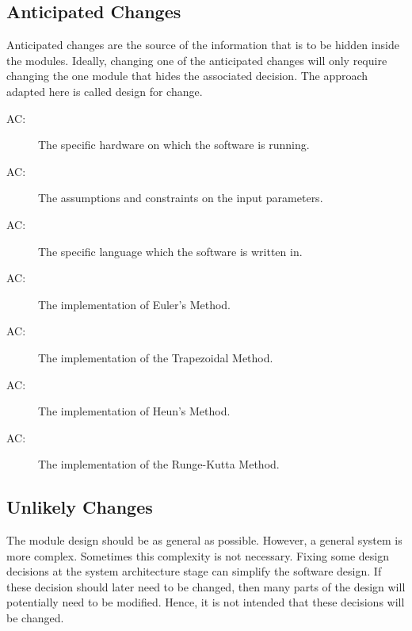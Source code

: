 \documentclass[12pt, titlepage]{article}
\newcounter{acnum}
\newcommand{\actheacnum}{AC\theacnum}
\begin{document}
\subsection{Anticipated Changes} \label{SecAchange}

Anticipated changes are the source of the information that is to be hidden
inside the modules. Ideally, changing one of the anticipated changes will only
require changing the one module that hides the associated decision. The approach
adapted here is called design for change.

\begin{description}
\item[ \actheacnum \label{acHardware}:] The specific
  hardware on which the software is running.
\item[ \actheacnum \label{acConstraints}:] The assumptions and constraints
on the input parameters.
\item[ \actheacnum \label{acLanguage}:] The specific language
which the software is written in. 
\item[ \actheacnum \label{acEulerMethod}:] The implementation
of Euler's Method.
\item[ \actheacnum \label{acTrapMethod}:] The implementation
of the Trapezoidal Method.
\item[ \actheacnum \label{acHeunMethod}:] The implementation
of Heun's Method.
\item[ \actheacnum \label{acRKMethod}:] The implementation
of the Runge-Kutta Method.
\end{description}

\subsection{Unlikely Changes} \label{SecUchange}

The module design should be as general as possible. However, a general system is
more complex. Sometimes this complexity is not necessary. Fixing some design
decisions at the system architecture stage can simplify the software design. If
these decision should later need to be changed, then many parts of the design
will potentially need to be modified. Hence, it is not intended that these
decisions will be changed.
\end{document}
